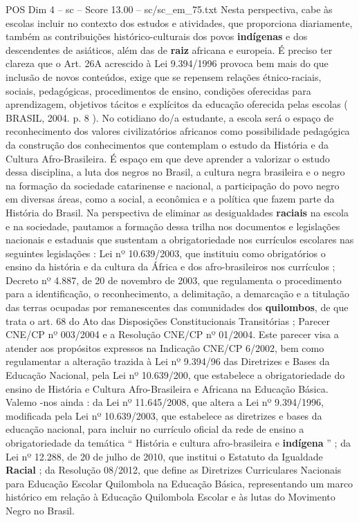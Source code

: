 \begin{textsample}{POS Dim 4 – sc – Score 13.00 – sc/sc\_em\_75.txt}
Nesta perspectiva, cabe às escolas incluir no contexto dos estudos e atividades, que proporciona diariamente, também as contribuições histórico-culturais dos povos \textbf{indígenas} e dos descendentes de asiáticos, além das de \textbf{raiz} africana e europeia.
É preciso ter clareza que o Art. 26A acrescido à Lei 9.394/1996 provoca bem mais do que inclusão de novos conteúdos, exige que se repensem relações étnico-raciais, sociais, pedagógicas, procedimentos de ensino, condições oferecidas para aprendizagem, objetivos tácitos e explícitos da educação oferecida pelas escolas ( BRASIL, 2004. p. 8 ).
No cotidiano do/a estudante, a escola será o espaço de reconhecimento dos valores civilizatórios africanos como possibilidade pedagógica da construção dos conhecimentos que contemplam o estudo da História e da Cultura Afro-Brasileira.
É espaço em que deve aprender a valorizar o estudo dessa disciplina, a luta dos negros no Brasil, a cultura negra brasileira e o negro na formação da sociedade catarinense e nacional, a participação do povo negro em diversas áreas, como a social, a econômica e a política que fazem parte da História do Brasil.
Na perspectiva de eliminar as desigualdades \textbf{raciais} na escola e na sociedade, pautamos a formação dessa trilha nos documentos e legislações nacionais e estaduais que sustentam a obrigatoriedade nos currículos escolares nas seguintes legislações : Lei nº 10.639/2003, que instituiu como obrigatórios o ensino da história e da cultura da África e dos afro-brasileiros nos currículos ; Decreto nº 4.887, de 20 de novembro de 2003, que regulamenta o procedimento para a identificação, o reconhecimento, a delimitação, a demarcação e a titulação das terras ocupadas por remanescentes das comunidades dos \textbf{quilombos}, de que trata o art. 68 do Ato das Disposições Constitucionais Transitórias ; Parecer CNE/CP nº 003/2004 e a Resolução CNE/CP nº 01/2004.
Este parecer visa a atender aos propósitos expressos na Indicação CNE/CP 6/2002, bem como regulamentar a alteração trazida à Lei nº 9.394/96 das Diretrizes e Bases da Educação Nacional, pela Lei nº 10.639/200, que estabelece a obrigatoriedade do ensino de História e Cultura Afro-Brasileira e Africana na Educação Básica.
Valemo -nos ainda : da Lei nº 11.645/2008, que altera a Lei nº 9.394/1996, modificada pela Lei nº 10.639/2003, que estabelece as diretrizes e bases da educação nacional, para incluir no currículo oficial da rede de ensino a obrigatoriedade da temática “ História e cultura afro-brasileira e \textbf{indígena} ” ; da Lei nº 12.288, de 20 de julho de 2010, que institui o Estatuto da Igualdade \textbf{Racial} ; da Resolução 08/2012, que define as Diretrizes Curriculares Nacionais para Educação Escolar Quilombola na Educação Básica, representando um marco histórico em relação à Educação Quilombola Escolar e às lutas do Movimento Negro no Brasil.

\end{textsample}

